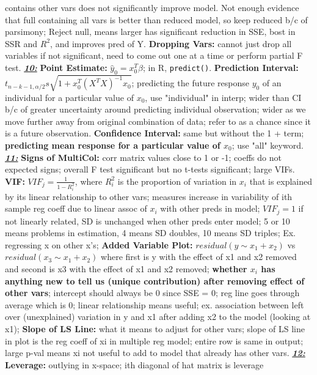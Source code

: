 \documentclass[8pt]{extarticle}
\begin{document}
contains other vars does not significantly improve model. Not enough evidence 
that full containing all vars is better than reduced model, so keep reduced 
b/c of parsimony; Reject null, means larger has significant reduction in SSE, 
bost in SSR and $R^2$, and improves pred of Y.
\textbf{Dropping Vars:} cannot just drop all variables if not significant, need 
to come out one at a time or perform partial F test.
\textit{\textbf{\underline{10:}}}
\textbf{Point Estimate:} $\hat{y}_0 = x^T_0\hat{\beta}$; in R, \texttt{predict()}.
\textbf{Prediction Interval:} $t_{n-k-1, \alpha/2} s \sqrt{1 + x^T_0
(X^TX)^{-1}x_0}$; predicting the future response $y_0$ of an individual for a 
particular value of $x_0$, use "individual" in interp; wider than CI b/c of 
greater uncertainty around predicting individual observation; wider as we move 
further away from original combination of data; refer to as a chance since it 
is a future observation.
\textbf{Confidence Interval:} same but without the 1 + term; \textbf{predicting 
mean response for a particular value of $x_0$}; use "all" keyword.
\textit{\textbf{\underline{11:}}}
\textbf{Signs of MultiCol:} corr matrix values close to 1 or -1; coeffs do not 
expected signs; overall F test significant but no t-tests significant; large 
VIFs.
\textbf{VIF:} $VIF_j = \frac{1}{1 - R^2_{i}}$, where $R^2_{i}$ is the proportion 
of variation in $x_i$ that is explained by its linear relationship to other vars; 
measures increase in variability of ith sample reg coeff due to linear assoc of 
$x_i$ with other preds in model; $VIF_j = 1$ if not linearly related, SD is 
unchanged when other preds enter model; 5 or 10 means problems in estimation, 
4 means SD doubles, 10 means SD triples; Ex. regressing x on other x's;
\textbf{Added Variable Plot:} $residual(y\sim x_1+x_2)$ vs $residual(x_3\sim 
x_1+x_2)$ where first is y with the effect of x1 and x2 removed and second is x3 
with the effect of x1 and x2 removed; \textbf{whether $x_i$ has anything new 
to tell us (unique contribution) after removing effect of other vars}; intercept 
should always be 0 since SSE = 0; reg line goes through average which is 0; 
linear relationship means useful; ex. association between left over (unexplained) 
variation in y and x1 after adding x2 to the model (looking at x1); 
\textbf{Slope of LS Line:} what it means to adjust for other vars; slope of LS 
line in plot is the reg coeff of xi in multiple reg model; entire row is same in
output; large p-val means xi not useful to add to model that already has other
vars.
\textit{\textbf{\underline{12:}}}
\textbf{Leverage:} outlying in x-space; ith diagonal of hat matrix is leverage
\end{document}
